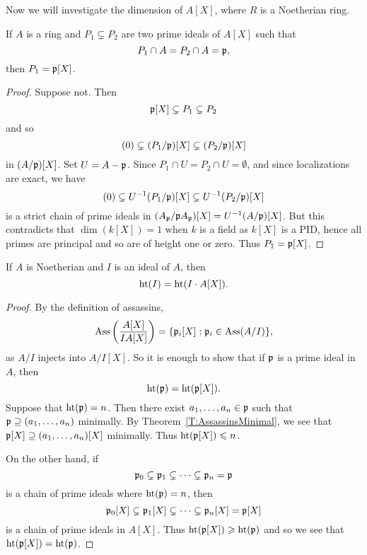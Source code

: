 \documentclass{ximera}
\begin{document}
Now we will investigate the dimension of $A[X]$, where $R$ is a
Noetherian ring.


\begin{lemma}\label{L:FT1} If $A$ is a ring and $P_1\subsetneq P_2$ are two prime ideals of $A[X]$ such that
\[
P_1\cap A = P_2\cap A = \mathfrak{p},
\]
then $P_1 = \mathfrak{p}[X]$.
\end{lemma}

\begin{proof} Suppose not. Then 
\[
\mathfrak{p}[X]\subsetneq P_1\subsetneq P_2 
\]
and so 
\[
(0) \subsetneq (P_1/\mathfrak{p})[X] \subsetneq (P_2/\mathfrak{p})[X]
\]
in $(A/\mathfrak{p}) [X]$. Set $U = A-\mathfrak{p}$.  Since $P_1 \cap U = P_2 \cap U = \emptyset$, and since localizations are exact, we have
\[
(0) \subsetneq U^{-1}(P_1/\mathfrak{p})[X] \subsetneq U^{-1}(P_2/\mathfrak{p})[X]
\]
is a strict chain of prime ideals in $(A_{\mathfrak{p}}/\mathfrak{p} A_{\mathfrak{p}})[X] = U^{-1}(A/\mathfrak{p})[X]$.  But this contradicts that $\dim(k[X]) = 1$ when $k$ is a field as $k[X]$ is a PID, hence all primes are principal and so are of height one or zero.  Thus $P_1 = \mathfrak{p}[X]$.
\end{proof}


\begin{lemma}\label{L:FT2}
  If $A$ is Noetherian and $I$ is an ideal of $A$, then
  \[
  \operatorname{ht}(I) = \operatorname{ht}(I\cdot A[X]).
  \]
  \begin{proof}
    By the definition of assassins,
    \[
    \operatorname{Ass}\left(\frac{A[X]}{IA[X]}\right) = \{\mathfrak{p}_i[X]: \mathfrak{p}_i\in\operatorname{Ass}(A/I)\},
    \]
    as $A/I$ injects into $A/I [X]$. So it is enough to show that if $\mathfrak{p}$ is a prime ideal in $A$, then 
    \[
    \operatorname{ht}(\mathfrak{p}) = \operatorname{ht}(\mathfrak{p}[X]).
    \]
    Suppose that $\operatorname{ht}(\mathfrak{p}) = n$. Then there exist $a_1,\dots,a_n\in \mathfrak{p}$
    such that $\mathfrak{p}\supseteq(a_1,\dots,a_n)$ minimally. By
    Theorem~\ref{T:AssassinsMinimal}, we see that
    $\mathfrak{p}[X]\supseteq(a_1,\dots,a_n)[X]$ minimally. Thus $\operatorname{ht}(\mathfrak{p}[X])\leqslant n$.
    
    On the other hand, if 
    \[
    \mathfrak{p}_0 \subsetneq \mathfrak{p}_1 \subsetneq \cdots \subsetneq \mathfrak{p}_n = \mathfrak{p}
    \] 
    is a chain of prime ideals where $\operatorname{ht}(\mathfrak{p}) = n$, then 
    \[
    \mathfrak{p}_0[X] \subsetneq \mathfrak{p}_1[X] \subsetneq \cdots \subsetneq \mathfrak{p}_n[X] = \mathfrak{p}[X]
    \]
    is a chain of prime ideals in $A[X]$. Thus $\operatorname{ht}(\mathfrak{p}[X])\geqslant \operatorname{ht}(\mathfrak{p})$
    and so we see that $\operatorname{ht}(\mathfrak{p}[X]) = \operatorname{ht}(\mathfrak{p})$.
\end{proof}
\end{lemma}
\end{document}
